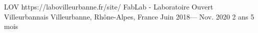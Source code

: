 \volunteerorganization%
{LOV}%
{https://labovilleurbanne.fr/site/}%
{FabLab - Laboratoire Ouvert Villeurbannais}%
{Villeurbanne, Rhône-Alpes, France}%
{Juin 2018--- Nov. 2020}
{2 ans 5 mois}
